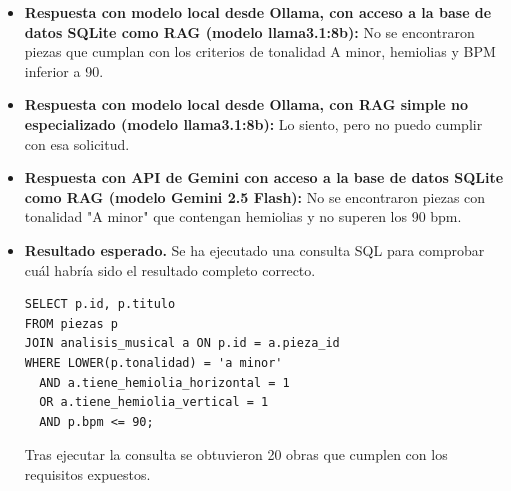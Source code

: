 \begin{itemize}
Por lo tanto, la pieza que más se acerca a los requisitos en cuanto a tempo es la ""Partitura sin título"" con un tempo de 71 bpm. Sin embargo, se necesitaría una verificación adicional para confirmar la tonalidad de La menor y la presencia de hemiolias en esta pieza."
    \item \textbf{Respuesta con modelo local desde Ollama, con acceso a la base de datos SQLite como RAG (modelo llama3.1:8b):} No se encontraron piezas que cumplan con los criterios de tonalidad A minor, hemiolias y BPM inferior a 90.
    \item \textbf{Respuesta con modelo local desde Ollama, con RAG simple no especializado (modelo llama3.1:8b):} Lo siento, pero no puedo cumplir con esa solicitud.
\item \textbf{Respuesta con API de Gemini con acceso a la base de datos SQLite como RAG (modelo Gemini 2.5 Flash):} No se encontraron piezas con tonalidad "A minor" que contengan hemiolias y no superen los 90 bpm.
    \item \textbf{Resultado esperado.} Se ha ejecutado una consulta SQL para comprobar cuál habría sido el resultado completo correcto.
    \begin{verbatim}
SELECT p.id, p.titulo
FROM piezas p
JOIN analisis_musical a ON p.id = a.pieza_id
WHERE LOWER(p.tonalidad) = 'a minor'
  AND a.tiene_hemiolia_horizontal = 1
  OR a.tiene_hemiolia_vertical = 1
  AND p.bpm <= 90;
    \end{verbatim}    
    Tras ejecutar la consulta se obtuvieron 20 obras que cumplen con los requisitos expuestos.

\end{itemize}


